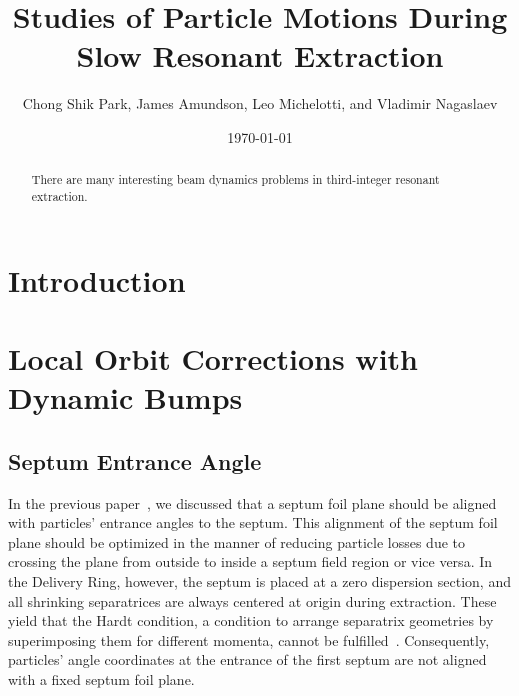 \documentclass[aps,prstab,onecolumn,preprint,endfloats,11pt]{revtex4-1}
\begin{document}
\title{Studies of Particle Motions During Slow Resonant Extraction}
\author{Chong Shik Park, James Amundson, Leo Michelotti, and Vladimir Nagaslaev}
\date{\today}

\begin{abstract}
There are many interesting beam dynamics problems in third-integer resonant extraction. 
\end{abstract}

\pacs{}

\setcounter{tocdepth}{7}


\section{\label{sec:intro}Introduction}



\section{\label{sec:bump}Local Orbit Corrections with Dynamic Bumps}

\subsection{\label{sec:bump0}Septum Entrance Angle}

In the previous paper~\cite{mu2e}, we discussed that a septum foil plane should be aligned with particles' entrance angles to the septum.
This alignment of the septum foil plane should be optimized in the manner of reducing particle losses due to crossing the plane from outside to inside a septum field region or vice versa.
In the Delivery Ring, however, the septum is placed at a zero dispersion section, and all shrinking separatrices are always centered at origin during extraction.
These yield that the Hardt condition, a condition to arrange separatrix geometries by superimposing them for different momenta, cannot be fulfilled~\cite{pullia}.
Consequently, particles' angle coordinates at the entrance of the first septum are not aligned with a fixed septum foil plane.
\end{document}
